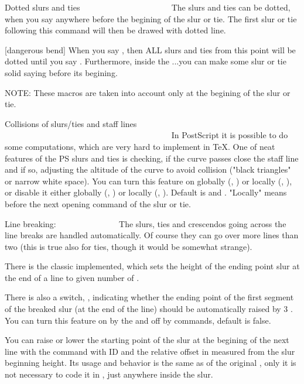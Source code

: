 Dotted slurs and ties
~~~~~~~~~~~~~~~~~~~~~
The slurs and ties can be dotted, when you say \dotted anywhere before
the begining of the slur or tie. The first slur or tie following this
command will then be drawed with dotted line.

[dangerous bend]  When you say \dotted, then ALL slurs and ties
                  from this point will be dotted until you say
\Solid. Furthermore, inside the \dotted...\Solid you can make some slur or
tie solid saying \solid before its begining.

NOTE: These macros are taken into account only at the begining
      of the slur or tie.


Collisions of slurs/ties and staff lines
~~~~~~~~~~~~~~~~~~~~~~~~~~~~~~~~~~~~~~~~
In PostScript it is possible to do some computations, which are very hard
to implement in TeX. One of neat features of the PS slurs and ties is
checking, if the curve passes close the staff line and if so, adjusting
the altitude of the curve to avoid collision ("black triangles" or narrow
white space). You can turn this feature on globally (\Sluradjust,
\Tieadjust) or locally (\sluradjust, \tieadjust), or disable it either
globally (\Nosluradjust, \Notieadjust) or locally (\nosluradjust,
\notieadjust). Default is \Sluradjust and \Notieadjust. "Locally"
means before the next opening command of the slur or tie.


Line breaking:
~~~~~~~~~~~~~~
The slurs, ties and crescendos going across the line breaks are handled
automatically. Of course they can go over more lines than two (this is
true also for ties, though it would be somewhat strange).

There is the classic \breakslur implemented, which sets the height of the
ending point slur at the end of a line to given number of \internotes.

There is also a switch, \ifslopebrkslurs, indicating whether the ending point
of the first segment of the breaked slur (at the end of the line) should
be automatically raised by 3 \internote. You can turn this feature on by
the \slopebrkslurstrue and off by \slopebrkslursfalse commands, default
is false.

You can raise or lower the starting point of the slur at the begining of
the next line with the command \liftslur with ID and the relative offset in
\internotes measured from the slur beginning height. Its usage and behavior
is the same as of the original \liftslur, only it is not necessary to code
it in \atnextstaff{}, just anywhere inside the slur.

